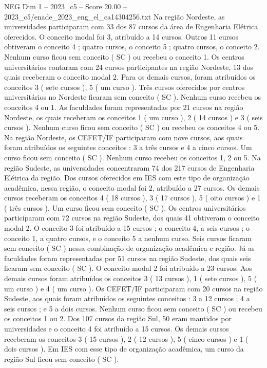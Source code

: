 \begin{textsample}{NEG Dim 1 – 2023\_c5 – Score 20.00 – 2023\_c5/enade\_2023\_eng\_el\_ca14304256.txt}
Na região Nordeste, as universidades participaram com 33 dos 87 cursos da área de Engenharia Elétrica oferecidos.
O conceito modal foi 3, atribuído a 14 cursos.
Outros 11 cursos obtiveram o conceito 4 ; quatro cursos, o conceito 5 ; quatro cursos, o conceito 2.
Nenhum curso ficou sem conceito ( SC ) ou recebeu o conceito 1.
Os centros universitários contaram com 24 cursos participantes na região Nordeste, 13 dos quais receberam o conceito modal 2.
Para os demais cursos, foram atribuídos os conceitos 3 ( sete cursos ), 5 ( um curso ).
Três cursos oferecidos por centros universitários no Nordeste ficaram sem conceito ( SC ).
Nenhum curso recebeu os conceitos 4 ou 1.
As faculdades foram representadas por 21 cursos na região Nordeste, os quais receberam os conceitos 1 ( um curso ), 2 ( 14 cursos ) e 3 ( seis cursos ).
Nenhum curso ficou sem conceito ( SC ) ou recebeu os conceitos 4 ou 5.
Na região Nordeste, os CEFET/IF participaram com nove cursos, aos quais foram atribuídos os seguintes conceitos : 3 a três cursos e 4 a cinco cursos.
Um curso ficou sem conceito ( SC ).
Nenhum curso recebeu os conceitos 1, 2 ou 5.
Na região Sudeste, as universidades concentraram 74 dos 217 cursos de Engenharia Elétrica da região.
Dos cursos oferecidos em IES com este tipo de organização acadêmica, nessa região, o conceito modal foi 2, atribuído a 27 cursos.
Os demais cursos receberam os conceitos 4 ( 18 cursos ), 3 ( 17 cursos ), 5 ( oito cursos ) e 1 ( três cursos ).
Um curso ficou sem conceito ( SC ).
Os centros universitários participaram com 72 cursos na região Sudeste, dos quais 41 obtiveram o conceito modal 2.
O conceito 3 foi atribuído a 15 cursos ; o conceito 4, a seis cursos ; o conceito 1, a quatro cursos, e o conceito 5 a nenhum curso.
Seis cursos ficaram sem conceito ( SC ) nessa combinação de organização acadêmica e região.
Já as faculdades foram representadas por 51 cursos na região Sudeste, dos quais seis ficaram sem conceito ( SC ).
O conceito modal 2 foi atribuído a 23 cursos.
Aos demais cursos foram atribuídos os conceitos 3 ( 13 cursos ), 1 ( sete cursos ), 5 ( um curso ) e 4 ( um curso ).
Os CEFET/IF participaram com 20 cursos na região Sudeste, aos quais foram atribuídos os seguintes conceitos : 3 a 12 cursos ; 4 a seis cursos ; e 5 a dois cursos.
Nenhum curso ficou sem conceito ( SC ) ou recebeu os conceitos 1 ou 2.
Dos 107 cursos da região Sul, 50 eram mantidos por universidades e o conceito 4 foi atribuído a 15 cursos.
Os demais cursos receberam os conceitos 3 ( 15 cursos ), 2 ( 12 cursos ), 5 ( cinco cursos ) e 1 ( dois cursos ).
Em IES com esse tipo de organização acadêmica, um curso da região Sul ficou sem conceito ( SC ).

\end{textsample}
